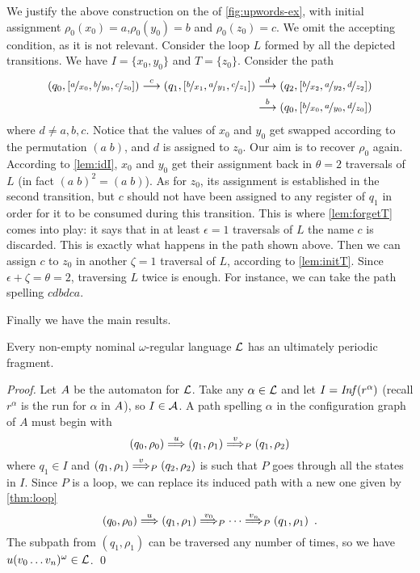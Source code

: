 \begin{example} We justify the above construction on the \hdma{} of \cref{fig:upwords-ex}, with initial assignment $\rho_0(x_0) = a$,$\rho_0(y_0) = b$ and $\rho_0(z_0) = c$. We omit the accepting condition, as it is not relevant. Consider the loop $L$ formed by all the depicted transitions.
We have $I = \{x_0,y_0\}$ and $T = \{z_0\}$. Consider the path
\begin{align*}
	(q_0,[\nicefrac{a}{x_0},\nicefrac{b}{y_0},\nicefrac{c}{z_0}]) \overset{c}{\longrightarrow} (q_1,[\nicefrac{b}{x_1},\nicefrac{a}{y_1},\nicefrac{c}{z_1}]) &\overset{d}{\longrightarrow} (q_2,[\nicefrac{b}{x_2},\nicefrac{a}{y_2},\nicefrac{d}{z_2}]) \\
	&\overset{b}{\longrightarrow} (q_0,[\nicefrac{b}{x_0},\nicefrac{a}{y_0},\nicefrac{d}{z_0}])
\end{align*}
where $d \neq a,b,c$. Notice that the values of $x_0$ and $y_0$ get swapped according to the permutation $(a \; b)$, and $d$ is assigned to $z_0$. Our aim is to recover $\rho_0$ again. According to \cref{lem:idI}, $x_0$ and $y_0$ get their assignment back in $\theta = 2$ traversals of $L$ (in fact $(a\; b)^2 = (a\; b)$). As for $z_0$, its assignment is established in the second transition, but $c$ should not have been assigned to any register of $q_1$ in order for it to be consumed during this transition. This is where \cref{lem:forgetT} comes into play: it says that in at least $\epsilon = 1$ traversals of $L$ the name $c$ is discarded. This is exactly what happens in the path shown above. Then we can assign $c$ to $z_0$ in another $\zeta = 1$ traversal of $L$, according to \cref{lem:initT}. Since $\epsilon + \zeta  = \theta = 2$, traversing $L$ twice is enough. For instance, we can take the path spelling $cdbdca$.
\end{example}
%
Finally we have the main results.
%
\begin{theorem}
\label{thm:up-fragment}
Every non-empty nominal $\omega$-regular language $\mathcal{L}$ has an ultimately periodic fragment.
\end{theorem}
\begin{proof}
Let $A$ be the automaton for $\mathcal{L}$. Take any $\alpha \in \mathcal{L}$ and let $I = \mathit{Inf}(r^\alpha)$ (recall $r^\alpha$ is the run for $\alpha$ in $A$), so $I \in \mathcal{A}$. A path spelling $\alpha$ in the configuration graph of $A$ must begin with
\[
	(q_0,\rho_0) \overset{u}{\Longrightarrow} (q_1,\rho_1) \overset{v}{\Longrightarrow}_{P} (q_1,\rho_2)
\]
where $q_1 \in I$ and $(q_1,\rho_1) \overset{v}{\Longrightarrow}_{P} (q_2,\rho_2)$ is such that $P$ goes through all the states in $I$. Since $P$ is a loop, we can replace its induced path with a new one given by \cref{thm:loop} 
\[
	(q_0,\rho_0) \overset{u}{\Longrightarrow} (q_1,\rho_1) \overset{v_0}{\Longrightarrow}_{P} \cdots \overset{v_n}{\Longrightarrow}_{P} (q_1,\rho_1) \enspace .
\]
The subpath from $(q_1,\rho_1)$ can be traversed any number of times, so we have $u(v_0\dots v_n)^\omega \in \mathcal{L}$.
\qed
\end{proof}

